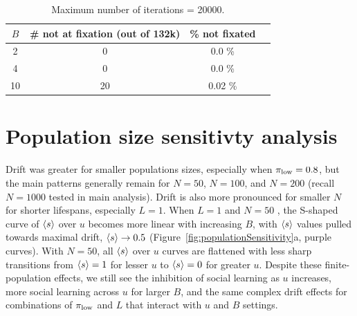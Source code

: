 \documentclass[letterpaper,11.5pt]{scrartcl}
\begin{document}
\begin{table}[h] \caption{Maximum number of iterations = 20000.} \label{tab:convergence} \centering
  \begin{tabular}{cccc} 
    \toprule $B$ & \# not at fixation (out of 132k) & \% not fixated \\ 
    \midrule  2  & 0  & 0.0 \% \\ 
              4  & 0  & 0.0 \% \\ 
              10 & 20 & 0.02 \% \\ 
    \bottomrule \end{tabular} 
\end{table}



\newpage

\section{Population size sensitivty analysis}

Drift was greater for smaller populations sizes, especially when $\pi_{\mathrm{low}}=0.8$, but 
the main patterns generally remain for $N=50$, $N=100$, and $N=200$ (recall
$N=1000$ tested in main analysis). Drift is also more pronounced for smaller $N$
for shorter lifespans, especially $L=1$. When $L=1$ and $N=50$ , the S-shaped
curve of $\langle s \rangle$ over $u$ becomes more linear with increasing $B$, 
with $\langle s \rangle$ values pulled towards maximal drift, $\langle s \rangle \to 0.5$ (Figure~\ref{fig:populationSensitivity}a,
purple curves). With
$N=50$, all $\langle s \rangle$ over $u$ curves are flattened with less sharp transitions
from $\langle s \rangle = 1$ for lesser $u$ to $\langle s \rangle = 0$ for greater $u$. Despite
these finite-population effects, we still see the inhibition of social learning
as $u$ increases, more social learning across $u$ for larger $B$, and the
same complex drift effects for combinations of $\pi_{\mathrm{low}}$ and $L$ that interact
with $u$ and $B$ settings.

\clearpage
\end{document}
